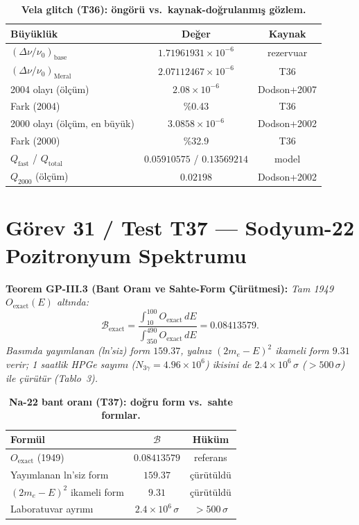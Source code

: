 \documentclass[12pt,a4paper]{article}
\begin{document}
\begin{table}[!htbp]
\centering\footnotesize
\setlength{\tabcolsep}{3pt}
\caption{\textbf{Vela glitch (T36): öngörü vs.\ kaynak-doğrulanmış gözlem.}}
\label{tab:vela}
\vspace{0.1cm}
\begin{tabular}{@{}l|c|c@{}}
\toprule
Büyüklük & Değer & Kaynak \\
\midrule
$(\Delta\nu/\nu_0)_{\mathrm{base}}$ & $1.71961931\times 10^{-6}$ & rezervuar \\
$(\Delta\nu/\nu_0)_{\mathrm{Meral}}$ & $2.07112467\times 10^{-6}$ & T36 \\
2004 olayı (ölçüm) & $2.08\times 10^{-6}$ & Dodson+2007 \\
Fark (2004) & \%0.43 & T36 \\
2000 olayı (ölçüm, en büyük) & $3.0858\times 10^{-6}$ & Dodson+2002 \\
Fark (2000) & \%32.9 & T36 \\
$Q_{\mathrm{fast}}$ / $Q_{\mathrm{total}}$ & $0.05910575$ / $0.13569214$ & model \\
$Q_{2000}$ (ölçüm) & $0.02198$ & Dodson+2002 \\
\bottomrule
\end{tabular}
\end{table}

\section{Görev 31 / Test T37 --- Sodyum-22 Pozitronyum Spektrumu}

\textbf{Teorem GP-III.3 (Bant Oranı ve Sahte-Form Çürütmesi):}
\textit{Tam 1949 $O_{\mathrm{exact}}(E)$ altında:}
\begin{equation}
\boxed{\mathcal{B}_{\mathrm{exact}}
=\frac{\int_{10}^{100}O_{\mathrm{exact}}\,dE}
{\int_{350}^{490}O_{\mathrm{exact}}\,dE}=0.08413579.}
\end{equation}
\textit{Basımda yayımlanan (ln'siz) form $159.37$, yalnız
$(2m_e-E)^2$ ikameli form $9.31$ verir;
1 saatlik HPGe sayımı ($N_{3\gamma}=4.96\times 10^6$) ikisini de
$2.4\times 10^6\,\sigma$ ($>500\,\sigma$) ile çürütür (Tablo~3).}

\begin{table}[!htbp]
\centering\footnotesize
\setlength{\tabcolsep}{3pt}
\caption{\textbf{Na-22 bant oranı (T37): doğru form vs.\ sahte formlar.}}
\label{tab:na22}
\vspace{0.1cm}
\begin{tabular}{@{}l|c|c@{}}
\toprule
Formül & $\mathcal{B}$ & Hüküm \\
\midrule
$O_{\mathrm{exact}}$ (1949) & $0.08413579$ & referans \\
Yayımlanan ln'siz form & $159.37$ & çürütüldü \\
$(2m_e-E)^2$ ikameli form & $9.31$ & çürütüldü \\
Laboratuvar ayrımı & $2.4\times 10^6\,\sigma$ & $>500\,\sigma$ \\
\bottomrule
\end{tabular}
\end{table}
\end{document}
